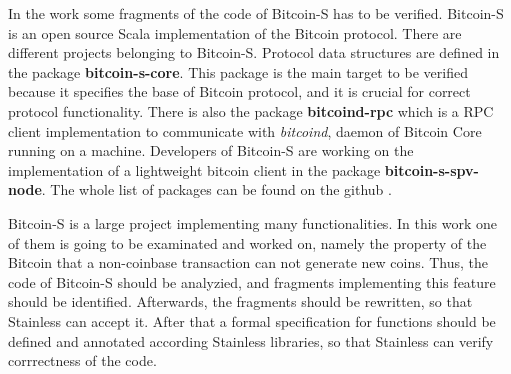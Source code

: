 In the work some fragments of the code of Bitcoin-S has to be verified. Bitcoin-S is an open source Scala implementation of the Bitcoin protocol. 
There are different projects belonging to Bitcoin-S. Protocol data structures are defined in the package \textbf{bitcoin-s-core}. This package is the main target to be verified because it specifies the base of Bitcoin protocol, and it is crucial for correct protocol functionality.
There is also the package \textbf{bitcoind-rpc} which is a RPC client implementation to communicate with \textit{bitcoind}, daemon of Bitcoin Core running on a machine.
Developers of Bitcoin-S are working on the implementation of a lightweight bitcoin client in the package \textbf{bitcoin-s-spv-node}.
The whole list of packages can be found on the github \cite{BitcoinSProject}.

Bitcoin-S is a large project implementing many functionalities. In this work one of them is going to be examinated and worked on, namely the property of the Bitcoin that a non-coinbase transaction can not generate new coins.
Thus, the code of Bitcoin-S should be analyzied, and fragments implementing this feature should be identified.
Afterwards, the fragments should be rewritten, so that Stainless can accept it. After that a formal specification for functions should be defined and annotated according Stainless libraries, so that Stainless can verify corrrectness of the code.


